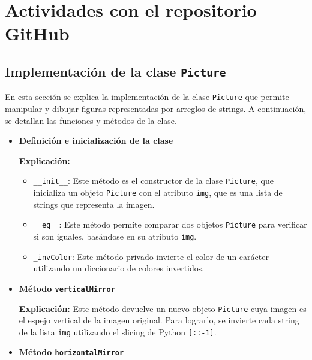 \documentclass{article}
\begin{document}
\section{Actividades con el repositorio GitHub}

\subsection{Implementación de la clase \texttt{Picture}}

En esta sección se explica la implementación de la clase \texttt{Picture} que permite manipular y dibujar figuras representadas por arreglos de strings. A continuación, se detallan las funciones y métodos de la clase.

\begin{itemize}
    \item \textbf{Definición e inicialización de la clase}



\textbf{Explicación:}
\begin{itemize}
    \item \texttt{\_\_init\_\_}: Este método es el constructor de la clase \texttt{Picture}, que inicializa un objeto \texttt{Picture} con el atributo \texttt{img}, que es una lista de strings que representa la imagen.
    \item \texttt{\_\_eq\_\_}: Este método permite comparar dos objetos \texttt{Picture} para verificar si son iguales, basándose en su atributo \texttt{img}.
    \item \texttt{\_invColor}: Este método privado invierte el color de un carácter utilizando un diccionario de colores invertidos.
\end{itemize}

    \item \textbf{Método \texttt{verticalMirror}}



\textbf{Explicación:}
Este método devuelve un nuevo objeto \texttt{Picture} cuya imagen es el espejo vertical de la imagen original. Para lograrlo, se invierte cada string de la lista \texttt{img} utilizando el slicing de Python \texttt{[::-1]}.

    \item \textbf{Método \texttt{horizontalMirror}}


\end{itemize}
\end{document}
